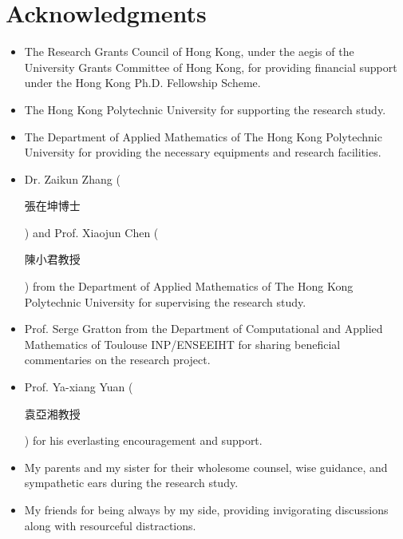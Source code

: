 \chapter*{Acknowledgments}
\label{chp:ack}

\begin{itemize}
    \item The Research Grants Council of Hong Kong, under the aegis of the University Grants Committee of Hong Kong, for providing financial support under the Hong Kong Ph.D. Fellowship Scheme.
    \item The Hong Kong Polytechnic University for supporting the research study.
    \item The Department of Applied Mathematics of The Hong Kong Polytechnic University for providing the necessary equipments and research facilities.
    \item Dr. Zaikun Zhang (\begin{CJK*}{UTF8}{bkai}張在坤博士\end{CJK*}) and Prof. Xiaojun Chen (\begin{CJK*}{UTF8}{bkai}陳小君教授\end{CJK*}) from the Department of Applied Mathematics of The Hong Kong Polytechnic University for supervising the research study.
    \item Prof. Serge Gratton from the Department of Computational and Applied Mathematics of Toulouse INP/ENSEEIHT for sharing beneficial commentaries on the research project.
    \item Prof. Ya-xiang Yuan (\begin{CJK*}{UTF8}{bkai}袁亞湘教授\end{CJK*}) for his everlasting encouragement and support.
    \item My parents and my sister for their wholesome counsel, wise guidance, and sympathetic ears during the research study.
    \item My friends for being always by my side, providing invigorating discussions along with resourceful distractions.
\end{itemize}
